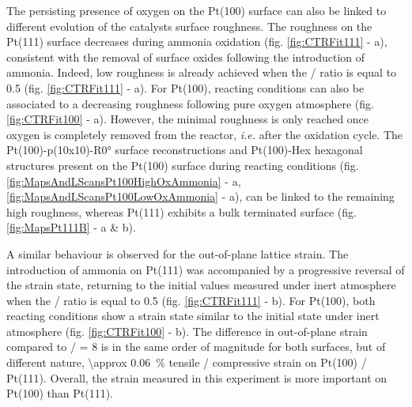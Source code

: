 The persisting presence of oxygen on the Pt(100) surface can also be linked to different evolution of the catalysts surface roughness.
The roughness on the Pt(111) surface decreases during ammonia oxidation (fig. \ref{fig:CTRFit111} - a), consistent with the removal of surface oxides following the introduction of ammonia.
Indeed, low roughness is already achieved when the / ratio is equal to \num{0.5} (fig. \ref{fig:CTRFit111} - a).
For Pt(100), reacting conditions can also be associated to a decreasing roughness following pure oxygen atmosphere (fig. \ref{fig:CTRFit100} - a).
However, the minimal roughness is only reached once oxygen is completely removed from the reactor, \textit{i.e.} after the oxidation cycle.
The  Pt(100)-p(10x10)-R\ang{0} surface reconstructions and Pt(100)-Hex hexagonal structures present on the Pt(100) surface during reacting conditions (fig. \ref{fig:MapsAndLScansPt100HighOxAmmonia} - a, \ref{fig:MapsAndLScansPt100LowOxAmmonia} - a), can be linked to the remaining high roughness, whereas Pt(111) exhibits a bulk terminated surface (fig. \ref{fig:MapsPt111B} - a \& b).

A similar behaviour is observed for the out-of-plane lattice strain.
The introduction of ammonia on Pt(111) was accompanied by a progressive reversal of the strain state, returning to the initial values measured under inert atmosphere when the / ratio is equal to \num{0.5} (fig. \ref{fig:CTRFit111} - b).
For Pt(100), both reacting conditions show a strain state similar to the initial state under inert atmosphere (fig. \ref{fig:CTRFit100} - b).
The difference in out-of-plane strain compared to / = 8 is in the same order of magnitude for both surfaces, but of different nature, \qty{\approx 0.06}{\percent} tensile / compressive strain on Pt(100) /  Pt(111).
Overall, the strain measured in this experiment is more important on Pt(100) than Pt(111).


